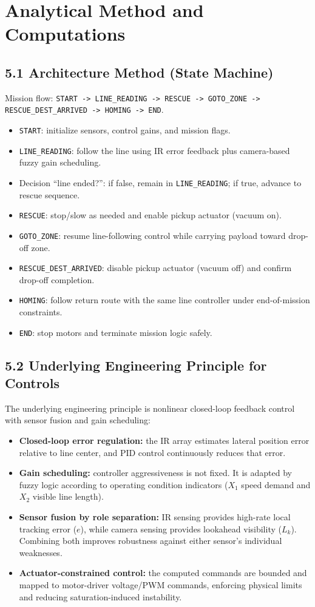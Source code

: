 \documentclass{article}
\begin{document}
\section{Analytical Method and Computations}
\subsection*{5.1 Architecture Method (State Machine)}
Mission flow: \texttt{START -> LINE\_READING -> RESCUE -> GOTO\_ZONE -> RESCUE\_DEST\_ARRIVED -> HOMING -> END}.
\begin{itemize}
\item \texttt{START}: initialize sensors, control gains, and mission flags.
\item \texttt{LINE\_READING}: follow the line using IR error feedback plus camera-based fuzzy gain scheduling.
\item Decision ``line ended?'': if false, remain in \texttt{LINE\_READING}; if true, advance to rescue sequence.
\item \texttt{RESCUE}: stop/slow as needed and enable pickup actuator (vacuum on).
\item \texttt{GOTO\_ZONE}: resume line-following control while carrying payload toward drop-off zone.
\item \texttt{RESCUE\_DEST\_ARRIVED}: disable pickup actuator (vacuum off) and confirm drop-off completion.
\item \texttt{HOMING}: follow return route with the same line controller under end-of-mission constraints.
\item \texttt{END}: stop motors and terminate mission logic safely.
\end{itemize}

\subsection*{5.2 Underlying Engineering Principle for Controls}
The underlying engineering principle is nonlinear closed-loop feedback control with sensor fusion and gain scheduling:
\begin{itemize}
\item \textbf{Closed-loop error regulation:} the IR array estimates lateral position error relative to line center, and PID control continuously reduces that error.
\item \textbf{Gain scheduling:} controller aggressiveness is not fixed. It is adapted by fuzzy logic according to operating condition indicators ($X_1$ speed demand and $X_2$ visible line length).
\item \textbf{Sensor fusion by role separation:} IR sensing provides high-rate local tracking error ($e$), while camera sensing provides lookahead visibility ($L_k$). Combining both improves robustness against either sensor's individual weaknesses.
\item \textbf{Actuator-constrained control:} the computed commands are bounded and mapped to motor-driver voltage/PWM commands, enforcing physical limits and reducing saturation-induced instability.
\end{itemize}
\end{document}
